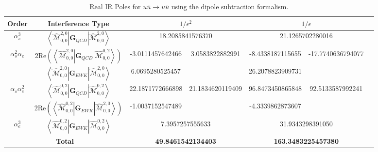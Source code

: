 \documentclass[a4paper]{article}
\def \MBra#1#2#3#4{\left<\hat{\mathcal{M}}_{#1,#2}^{#3,#4}\right|}
\def \MKet#1#2#3#4{\left|\hat{\mathcal{M}}_{#1,#2}^{#3,#4}\right>}
\begin{document}
\begin{table}[ht!]
 \begin{tabular}{c|c|c|c|c|c|c}
 Order& Interference Type
 & \multicolumn{2}{c}{$1/\epsilon^{2}$} 
 & \multicolumn{2}{|c}{$1/\epsilon$}\\\hline
 $\alpha_s^3$                           
 & $\MBra{0}{0}{2}{0}\textbf{G}_{QCD}\MKet{0}{0}{2}{0}$
 & \multicolumn{2}{|c|}{18.2085841576370} 
 & \multicolumn{2}{|c|}{21.1265702280016} \\\hline
 \multirow{2}{*}{$\alpha_s^2\alpha_e$}                                                        
 & 2Re$\left(\MBra{0}{0}{2}{0}\textbf{G}_{QCD}\MKet{0}{0}{0}{2}\right)$
 & -3.0111457642466 & \multirow{2}{*}{3.0583822882991} 
 & -8.4338187115655 & \multirow{2}{*}{-17.7740636794077} \\
 & $\MBra{0}{0}{2}{0}\textbf{G}_{EWK}\MKet{0}{0}{2}{0}$
 & 6.0695280525457 && 26.2078823909731 &\\\hline
 \multirow{2}{*}{$\alpha_s\alpha_e^2$}                                                  
 & $\MBra{0}{0}{0}{2}\textbf{G}_{QCD}\MKet{0}{0}{0}{2}$
 & 22.1871772666898 & \multirow{2}{*}{21.1834620119409} 
 & 96.8473450865848 & \multirow{2}{*}{92.5133587992241} \\
 & 2Re$\left(\MBra{0}{0}{0}{2}\textbf{G}_{EWK}\MKet{0}{0}{2}{0}\right)$ 
 & -1.0037152547489 && -4.3339862873607 &\\\hline
 $\alpha_e^3$                                                                             
 & $\MBra{0}{0}{0}{2}\textbf{G}_{EWK}\MKet{0}{0}{0}{2}$
 & \multicolumn{2}{|c|}{7.3957257555633} 
 & \multicolumn{2}{|c}{31.9343298391050} \\\hline
   \multicolumn{2}{c|}{\textbf{Total}}     
 & \multicolumn{2}{|c|}{\textbf{49.8461542134403}} 
 & \multicolumn{2}{|c}{\textbf{163.3483225457380}}\\\hline
 \end{tabular}
 \caption{Real IR Poles for $u\bar u\longrightarrow u\bar u$ using the dipole subtraction formalism.}
 \label{real_uubar}
\end{table}
\end{document}
